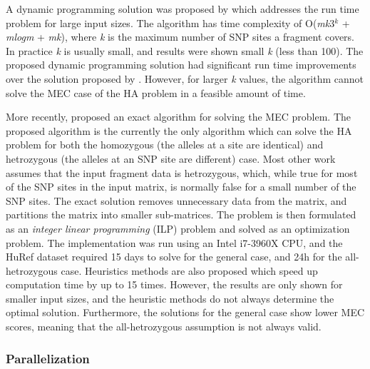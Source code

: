\documentclass[10pt,twocolumn]{witseiepaper}
\newcommand{\K}{\textit{k }}
\begin{document}
A dynamic programming solution was proposed by \cite{xie:2008} which addresses the run time problem for large
input sizes. The algorithm has time complexity of O(\textit{mk}3$^{\textit{k}}$ + \textit{mlogm} +
\textit{mk}), where \K is the maximum number of SNP sites a fragment covers. In practice \K is usually small,
and results were shown small \K (less than 100). The proposed dynamic programming solution had significant run
time improvements over the solution proposed by \cite{wang:2005}. However, for larger \K values, the 
algorithm cannot solve the MEC case of the HA problem in a feasible amount of time. 

More recently, \cite{chen:2013} proposed an exact algorithm for solving the MEC problem. The proposed
algorithm is the currently the only algorithm which can solve the HA problem for both the homozygous (the 
alleles at a site are identical) and hetrozygous (the alleles at an SNP site are different) case. Most other 
work assumes that the input fragment data is hetrozygous, which, while true for most of the SNP sites in the
input matrix, is normally false for a small number of the SNP sites. The exact solution removes unnecessary
data from the matrix, and partitions the matrix into smaller sub-matrices. The problem is then formulated as
an \textit{integer linear programming} (ILP) problem and solved as an optimization problem. The implementation was
run using an Intel i7-3960X CPU, and the HuRef dataset required 15 days to solve for the general case, and 24h
for the all-hetrozygous case. Heuristics methods are also proposed which speed up computation time by up to 15
times. However, the results are only shown for smaller input sizes, and the heuristic methods do not always
determine the optimal solution. Furthermore, the solutions for the general case show lower MEC scores, meaning
that the all-hetrozygous assumption is not always valid. 

\subsubsection{Parallelization}
\end{document}
